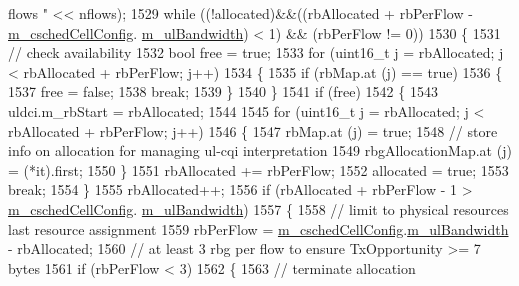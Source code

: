 \begin{DoxyCode}
{       flows "} << nflows);
1529       \textcolor{keywordflow}{while} ((!allocated)&&((rbAllocated + rbPerFlow - \hyperlink{classns3_1_1TdMtFfMacScheduler_a585412f686e33f49dad1003e5d2216f0}{m\_cschedCellConfig}.
      \hyperlink{structns3_1_1FfMacCschedSapProvider_1_1CschedCellConfigReqParameters_a5ab5b102878e6e7e7727a14af4a64d2f}{m\_ulBandwidth}) < 1) && (rbPerFlow != 0))
1530         \{
1531           \textcolor{comment}{// check availability}
1532           \textcolor{keywordtype}{bool} free = \textcolor{keyword}{true};
1533           \textcolor{keywordflow}{for} (uint16\_t j = rbAllocated; j < rbAllocated + rbPerFlow; j++)
1534             \{
1535               \textcolor{keywordflow}{if} (rbMap.at (j) == \textcolor{keyword}{true})
1536                 \{
1537                   free = \textcolor{keyword}{false};
1538                   \textcolor{keywordflow}{break};
1539                 \}
1540             \}
1541           \textcolor{keywordflow}{if} (free)
1542             \{
1543               uldci.m\_rbStart = rbAllocated;
1544 
1545               \textcolor{keywordflow}{for} (uint16\_t j = rbAllocated; j < rbAllocated + rbPerFlow; j++)
1546                 \{
1547                   rbMap.at (j) = \textcolor{keyword}{true};
1548                   \textcolor{comment}{// store info on allocation for managing ul-cqi interpretation}
1549                   rbgAllocationMap.at (j) = (*it).first;
1550                 \}
1551               rbAllocated += rbPerFlow;
1552               allocated = \textcolor{keyword}{true};
1553               \textcolor{keywordflow}{break};
1554             \}
1555           rbAllocated++;
1556           \textcolor{keywordflow}{if} (rbAllocated + rbPerFlow - 1 > \hyperlink{classns3_1_1TdMtFfMacScheduler_a585412f686e33f49dad1003e5d2216f0}{m\_cschedCellConfig}.
      \hyperlink{structns3_1_1FfMacCschedSapProvider_1_1CschedCellConfigReqParameters_a5ab5b102878e6e7e7727a14af4a64d2f}{m\_ulBandwidth})
1557             \{
1558               \textcolor{comment}{// limit to physical resources last resource assignment}
1559               rbPerFlow = \hyperlink{classns3_1_1TdMtFfMacScheduler_a585412f686e33f49dad1003e5d2216f0}{m\_cschedCellConfig}.\hyperlink{structns3_1_1FfMacCschedSapProvider_1_1CschedCellConfigReqParameters_a5ab5b102878e6e7e7727a14af4a64d2f}{m\_ulBandwidth} - rbAllocated;
1560               \textcolor{comment}{// at least 3 rbg per flow to ensure TxOpportunity >= 7 bytes}
1561               \textcolor{keywordflow}{if} (rbPerFlow < 3)
1562                 \{
1563                   \textcolor{comment}{// terminate allocation}

\end{DoxyCode}
